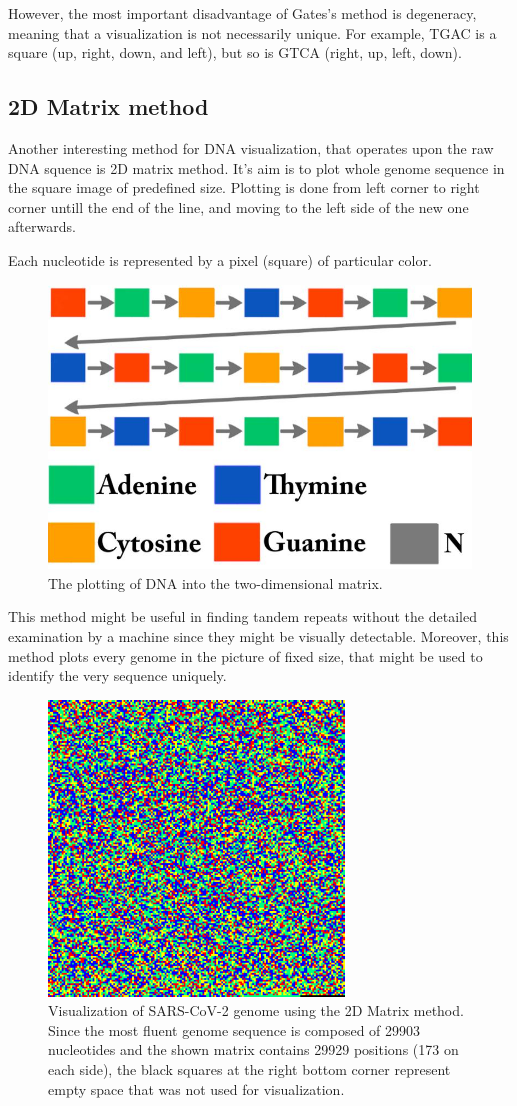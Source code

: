 However, the most important disadvantage of Gates's method is degeneracy, meaning that a visualization is not necessarily unique. 
For example, TGAC is a square (up, right, down, and left), but so is GTCA (right, up, left, down).

\subsection{2D Matrix method}
Another interesting method for DNA visualization, that operates upon the raw DNA squence is 2D matrix method. 
It's aim is to plot whole genome sequence in the square image of predefined size.
Plotting is done from left corner to right corner untill the end of the line, and moving to the left side of the new one afterwards.

Each nucleotide is represented by a pixel (square) of particular color.
\begin{figure}[!ht]
	\centering
	\includegraphics[width=.4\textwidth]{figures/2d.png}
	\caption{The plotting of DNA into the two-dimensional matrix.\label{o:latex_friendly_zone}}
\end{figure}

This method might be useful in finding tandem repeats \cite{fgene} without the detailed examination by a machine since they might be visually detectable.
Moreover, this method plots every genome in the picture of fixed size, that might be used to identify the very sequence uniquely.

\begin{figure}[!ht]
	\centering
	\includegraphics[width=0.7\textwidth]{figures/matrix.png}
	\caption{Visualization of SARS-CoV-2 genome using the 2D Matrix method. Since the most fluent genome sequence is composed of 29903 nucleotides and the shown matrix contains 29929 positions (173 on each side), the black squares at the right bottom corner represent empty space that was not used for visualization.\label{o:latex_friendly_zone}}
\end{figure}

